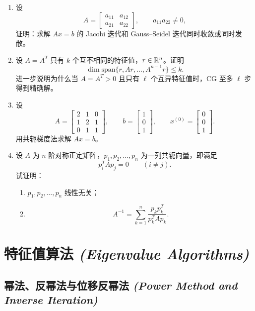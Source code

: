 \documentclass{article}
\newcommand{\eng}[1]{\texorpdfstring{{\normalfont\rmfamily\itshape\textcolor{blue!65!black}{(#1)}}}{(#1)}}
\begin{document}
\begin{enumerate}
  \item 设
  \[
    A=\begin{bmatrix}a_{11}&a_{12}\\a_{21}&a_{22}\end{bmatrix},\qquad a_{11}a_{22}\ne0,
  \]
  证明：求解 $Ax=b$ 的 Jacobi 迭代和 Gauss--Seidel 迭代同时收敛或同时发散。

  \item 设 $A=A^T$ 只有 $k$ 个互不相同的特征值，$r\in\mathbb{R}^n$。证明
  \[
    \dim\mathrm{span}\{r,Ar,\dots,A^{n-1}r\}\le k.
  \]
  进一步说明为什么当 $A=A^T>0$ 且只有 $\ell$ 个互异特征值时，CG 至多 $\ell$ 步得到精确解。

  \item 设
  \[
    A=\begin{bmatrix}2&1&0\\1&2&1\\0&1&1\end{bmatrix},\qquad
    b=\begin{bmatrix}1\\0\\1\end{bmatrix},\qquad
    x^{(0)}=\begin{bmatrix}0\\0\\1\end{bmatrix}.
  \]
  用共轭梯度法求解 $Ax=b$。

  \item 设 $A$ 为 $n$ 阶对称正定矩阵，$p_1,p_2,\dots,p_n$ 为一列共轭向量，即满足
  \[
    p_i^TAp_j=0\qquad(i\ne j).
  \]
  试证明：
  \begin{enumerate}[(1)]
    \item $p_1,p_2,\dots,p_n$ 线性无关；
    \item
    \[
      A^{-1}=\sum_{k=1}^n\frac{p_kp_k^T}{p_k^TAp_k}.
    \]
  \end{enumerate}
\end{enumerate}

\section{特征值算法 \eng{Eigenvalue Algorithms}}

\subsection{幂法、反幂法与位移反幂法 \eng{Power Method and Inverse Iteration}}
\end{document}
